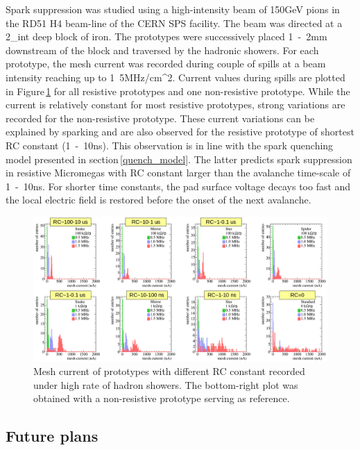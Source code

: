 \documentclass{article}
\begin{document}
Spark suppression was studied using a high-intensity beam of \unit{150}{GeV} pions in the RD51 H4 beam-line of the CERN SPS facility.
The beam was directed at a \unit{2}{\lambda_{\rm int}} deep block of iron.
The prototypes were successively placed \unit{1-2}{mm} downstream of the block and traversed by the hadronic showers.
For each prototype, the mesh current was recorded during couple of spills at a beam intensity reaching up to \unit{1.5}{MHz/cm^{2}}.
Current values during spills are plotted in Figure\,\ref{sparking_RCscan} for all resistive prototypes and one non-resistive prototype.
While the current is relatively constant for most resistive prototypes, strong variations are recorded for the non-resistive prototype. These current variations can be explained by sparking and are also observed for the resistive prototype of shortest RC constant (\unit{1-10}{ns}).
This observation is in line with the spark quenching model presented in section\,\ref{quench_model}.
The latter predicts spark suppression in resistive Micromegas with RC constant larger than the avalanche time-scale of \unit{1-10}{ns}. For shorter time constants, the pad surface voltage decays too fast and the local electric field is restored before the onset of the next avalanche.

\begin{figure}[h]
\centering
\includegraphics[width=0.95\linewidth]{sparking_RCscan}
\caption{Mesh current of prototypes with different RC constant recorded under high rate of hadron showers. The bottom-right plot was obtained with a non-resistive prototype serving as reference.}
\label{sparking_RCscan}
\end{figure}

\subsection{Future plans}
\end{document}
